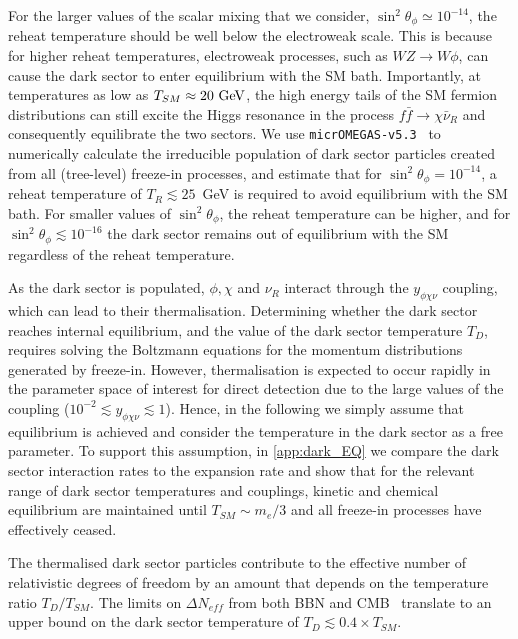 \documentclass[aps, prd, reprint, nofootinbib, amsmath, amssymb, floatfix]{revtex4-2}
\begin{document}
For the larger values of the scalar mixing that we consider, $\sin^2\theta_\phi \simeq 10^{-14}$, the reheat temperature should be well below the electroweak scale. This is because for higher reheat temperatures, electroweak processes, such as $W Z \to W \phi$, can cause the dark sector to enter equilibrium with the SM bath. Importantly, at temperatures as low as $T_{SM} \approx 20~\rm{GeV}$, the high energy tails of the SM fermion distributions can still excite the Higgs resonance in the process $f\bar{f} \to \chi \bar{\nu}_R$ and consequently equilibrate the two sectors. We use \texttt{micrOMEGAS-v5.3}~\cite{Alguero:2022inz} to numerically calculate the irreducible population of dark sector particles created from all (tree-level) freeze-in processes, and estimate that for $\sin^2\theta_\phi = 10^{-14}$, a reheat temperature of $T_R \lesssim 25$~GeV is required to avoid equilibrium with the SM bath. For smaller values of $\sin^2\theta_\phi$, the reheat temperature can be higher, and for $\sin^2\theta_\phi \lesssim 10^{-16}$ the dark sector remains out of equilibrium with the SM regardless of the reheat temperature.

As the dark sector is populated, $\phi, \chi$ and $\nu_R$ interact through the $y_{\phi\chi\nu}$ coupling, which can lead to their thermalisation. Determining whether the dark sector reaches internal equilibrium, and the value of the dark sector temperature $T_D$, requires solving the Boltzmann equations for the momentum distributions generated by freeze-in. However, thermalisation is expected to occur rapidly in the parameter space of interest for direct detection due to the large values of the coupling ($10^{-2} \lesssim y_{\phi\chi\nu} \lesssim 1$). Hence, in the following we simply assume that equilibrium is achieved and consider the temperature in the dark sector as a free parameter. To support this assumption, in \cref{app:dark_EQ} we compare the dark sector interaction rates to the expansion rate and show that for the relevant range of dark sector temperatures and couplings, kinetic and chemical equilibrium are maintained until $T_{SM} \sim m_e/3$ and all freeze-in processes have effectively ceased.

The thermalised dark sector particles contribute to the effective number of relativistic degrees of freedom by an amount that depends on the temperature ratio $T_D/T_{SM}$. The limits on $\Delta N_{eff}$ from both BBN and CMB~\cite{Yeh:2022heq} translate to an upper bound on the dark sector temperature of $T_D \lesssim 0.4 \times T_{SM}$.
\end{document}
